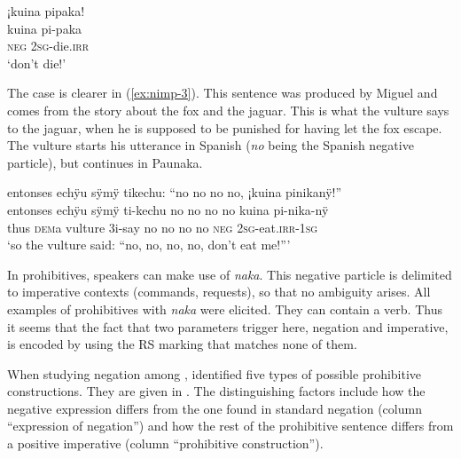 \ea\label{ex:nimp-2}
\begingl
\glpreamble ¡kuina pipaka!\\
\gla kuina pi-paka\\
\glb \textsc{neg} 2\textsc{sg}-die.\textsc{irr}\\
\glft ‘don’t die!’
\endgl
\trailingcitation{[ump-p110815sf.465]}
\xe

The case is clearer in (\ref{ex:nimp-3}). This sentence was produced by Miguel and comes from the story about the fox and the jaguar. This is what the vulture says to the jaguar, when he is supposed to be punished for having let the fox escape. The vulture starts his utterance in Spanish (\textit{no} being the Spanish negative particle), but continues in Paunaka.

\newpage
\ea\label{ex:nimp-3}
\begingl
\glpreamble entonses echÿu sÿmÿ tikechu: “no no no no, ¡kuina pinikanÿ!”\\
\gla entonses echÿu sÿmÿ ti-kechu {no no no no} kuina pi-nika-nÿ\\
\glb thus \textsc{dem}a vulture 3i-say {no no no no} \textsc{neg} 2\textsc{sg}-eat.\textsc{irr}-1\textsc{sg}\\
\glft ‘so the vulture said: “no, no, no, no, don’t eat me!”’
\endgl
\trailingcitation{[jmx-n120429ls-x5.180]}
\xe

In prohibitives, speakers can make use of \textit{naka}. This negative particle is delimited to imperative contexts (commands, requests), so that no ambiguity arises. All examples of prohibitives with \textit{naka} were elicited. They can contain a  verb. Thus it seems that the fact that two parameters trigger  here, negation and imperative, is encoded by using the RS marking that matches none of them. 

When studying negation among , \citet[]{Michael2014b} %
identified five types of possible prohibitive constructions. They are given in .
The distinguishing factors include how the negative expression differs from the one found in standard negation (column “expression of negation”) and how the rest of the prohibitive sentence differs from a positive imperative (column “prohibitive construction”).

\begin{table}[htbp]
\caption{Prohibitive construction types by \citet[270]{Michael2014b}}%

\label{table:ProhibitiveTypes}
\end{table}
 
